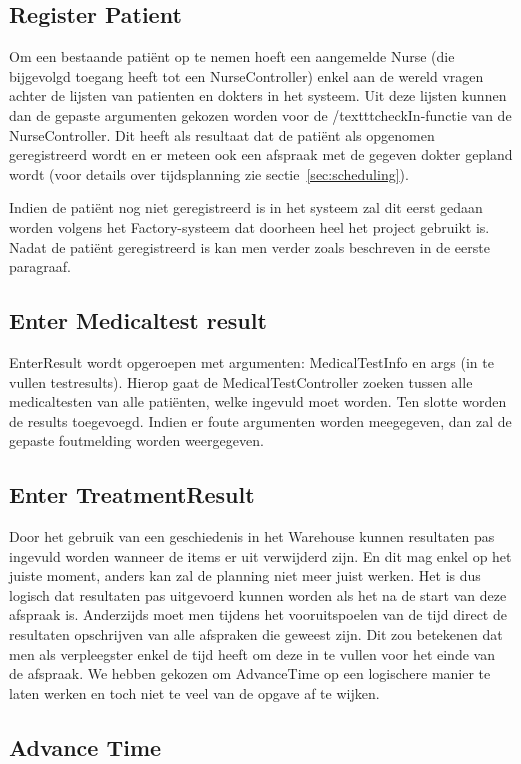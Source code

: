 \documentclass[a4paper]{article}
\begin{document}
\subsection{Register Patient}
Om een bestaande pati\"ent op te nemen hoeft een aangemelde Nurse (die bijgevolgd toegang heeft tot een NurseController) enkel aan de wereld vragen achter de lijsten van patienten en dokters in het systeem. Uit deze lijsten kunnen dan de gepaste argumenten gekozen worden voor de /texttt{checkIn}-functie van de NurseController. Dit heeft als resultaat dat de pati\"ent als opgenomen geregistreerd wordt en er meteen ook een afspraak met de gegeven dokter gepland wordt (voor details over tijdsplanning zie sectie~\ref{sec:scheduling}).

Indien de pati\"ent nog niet geregistreerd is in het systeem zal dit eerst gedaan worden volgens het Factory-systeem dat doorheen heel het project  gebruikt is. Nadat de pati\"ent geregistreerd is kan men verder zoals beschreven in de eerste paragraaf.
\subsection{Enter Medicaltest result}
EnterResult wordt opgeroepen met argumenten: MedicalTestInfo en args (in te vullen testresults). Hierop gaat de MedicalTestController zoeken tussen alle medicaltesten van alle pati\"enten, welke ingevuld moet worden. Ten slotte worden de results toegevoegd. Indien er foute argumenten worden meegegeven, dan zal de gepaste foutmelding worden weergegeven.

\subsection{Enter TreatmentResult}
Door het gebruik van een geschiedenis in het Warehouse kunnen resultaten pas ingevuld worden wanneer de items er uit verwijderd zijn. En dit mag enkel op het juiste moment, anders kan zal de planning niet meer juist werken. Het is dus logisch dat resultaten pas uitgevoerd kunnen worden als het na de start van deze afspraak is. Anderzijds moet men tijdens het vooruitspoelen van de tijd direct de resultaten opschrijven van alle afspraken die geweest zijn. Dit zou betekenen dat men als verpleegster enkel de tijd heeft om deze in te vullen voor het einde van de afspraak. We hebben gekozen om AdvanceTime op een logischere manier te laten werken en toch niet te veel van de opgave af te wijken.


\subsection{Advance Time}
\end{document}
